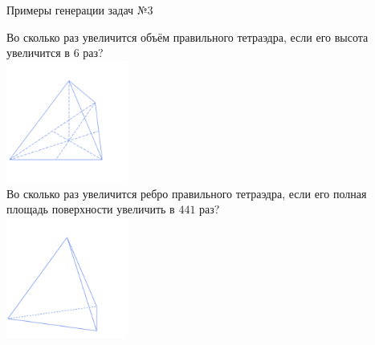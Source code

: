 \documentclass[aspectratio=169,12pt]{beamer}
\begin{document}
\begin{frame}{Примеры генерации задач №3}
	\begin{multicols}{4}
		Во сколько раз увеличится объём правильного тетраэдра, если его высота увеличится в $6$ раз?\\

		\includegraphics[width=0.3\textwidth]{3}\\

		Во сколько раз увеличится ребро правильного тетраэдра, если его полная площадь поверхности увеличить в $441$ раз?\\

		\includegraphics[width=0.3\textwidth]{4}

	\end{multicols}
\end{frame}
\end{document}
